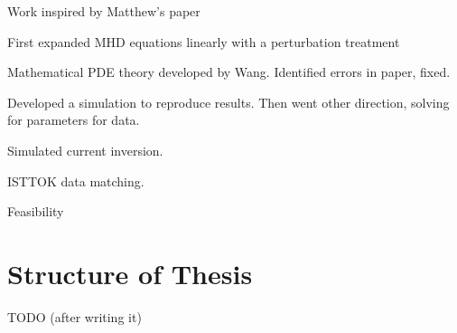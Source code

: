 Work inspired by Matthew's paper 

First expanded MHD equations linearly with a perturbation treatment

Mathematical PDE theory developed by Wang. Identified errors in paper, fixed. 

Developed a simulation to reproduce results. Then went other direction, 
solving for parameters for data. 

Simulated current inversion.

ISTTOK data matching.

Feasibility



\section{Structure of Thesis}

TODO (after writing it)

